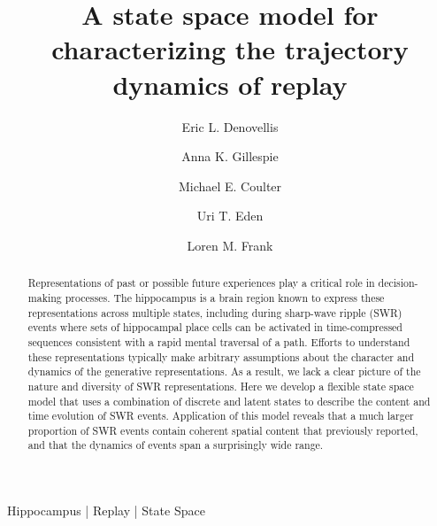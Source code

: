 \documentclass[times, twoside]{zHenriquesLab-StyleBioRxiv}
\begin{document}
\title{A state space model for characterizing the trajectory dynamics of replay}

\author[1]{Eric L. Denovellis}
\author[2, 3]{Anna K. Gillespie}
\author[2, 3]{Michael E. Coulter}
\author[4]{Uri T. Eden}
\author[1, 2, 3, \Letter]{Loren M. Frank}



\maketitle

\begin{abstract}
Representations of past or possible future experiences play a critical role in decision-making processes. The hippocampus is a brain region known to express these representations across multiple states, including during sharp-wave ripple (SWR) events where sets of hippocampal place cells can be activated in time-compressed sequences consistent with a rapid mental traversal of a path. Efforts to understand these representations typically make arbitrary assumptions about the character and dynamics of the generative representations. As a result, we lack a clear picture of the nature and diversity of SWR representations. Here we develop a flexible state space model that uses a combination of discrete and latent states to describe the content and time evolution of SWR events. Application of this model reveals that a much larger proportion of SWR events contain coherent spatial content that previously reported, and that the dynamics of events span a surprisingly wide range. 

\end {abstract}

\begin{keywords}
Hippocampus | Replay | State Space
\end{keywords}
\end{document}

